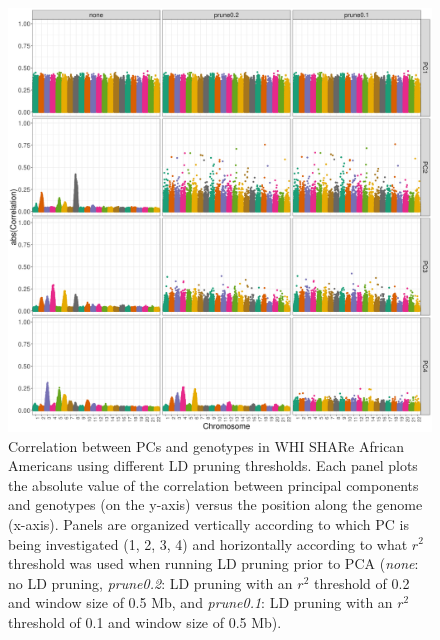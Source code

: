 \documentclass[12pt]{article}
\begin{document}
\begin{figure}[h]
\center
\includegraphics[width=\textwidth]{figs/pc_geno_corr/pc_geno_corr_compare_prune}
\caption{Correlation between PCs and genotypes in WHI SHARe African Americans using different LD pruning thresholds. Each panel plots the absolute value of the correlation between principal components and genotypes (on the y-axis) versus the position along the genome (x-axis).  Panels are organized vertically according to which PC is being investigated (1, 2, 3, 4) and horizontally according to what $r^2$ threshold was used when running LD pruning prior to PCA (\textit{none}: no LD pruning, \textit{prune0.2}: LD pruning with an $r^2$ threshold of 0.2 and window size of 0.5 Mb, and \textit{prune0.1}: LD pruning with an $r^2$ threshold of 0.1 and window size of 0.5 Mb).}
\label{fig:corr-compare-prune}
\end{figure}
\end{document}
